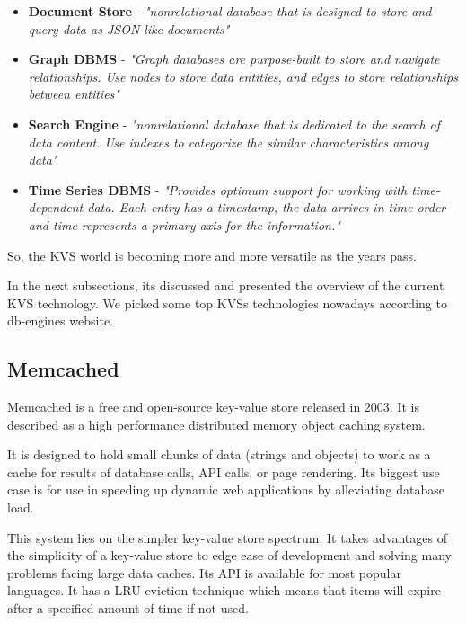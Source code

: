 \begin{itemize}
	\item \textbf{Document Store} - \textit{"nonrelational database that is designed to store and query data as JSON-like documents"} \cite{aws-nosql:1}
	\item \textbf{Graph \gls{DBMS}} - \textit{"Graph databases are purpose-built to store and navigate relationships. Use nodes to store data entities, and edges to store relationships between entities"} \cite{aws-nosql:2} 
	\item \textbf{Search Engine} - \textit{"nonrelational database that is dedicated to the search of data content. Use indexes to categorize the similar characteristics among data"} \cite{aws-nosql:3} 
	\item \textbf{Time Series \gls{DBMS}} - \textit{"Provides optimum support for working with time-dependent data. Each entry has a timestamp, the data arrives in time order and time represents a primary axis for the information."} \cite{timeSeries:1}
\end{itemize}

So, the \gls{KVS} world is becoming more and more versatile as the years pass.

In the next subsections, its discussed and presented the overview of the current \gls{KVS} technology. We picked some top KVSs technologies nowadays according to db-engines \cite{db-engine:2} website.

\subsection{Memcached} %
\label{ssec:memcached}

Memcached \cite{memcached:1} is a free and open-source key-value store released in 2003. It is described as a high performance distributed memory object caching system.

It is designed to hold small chunks of data (strings and objects) to work as a cache for results of database calls, API calls, or page rendering. Its biggest use case is for use in speeding up dynamic web applications by alleviating database load.

This system lies on the simpler key-value store spectrum. It takes advantages of the simplicity of a key-value store to edge ease of development and solving many problems facing large data caches. Its API is available for most popular languages. It has a \gls{LRU} eviction technique which means that items will expire after a specified amount of time if not used. 

